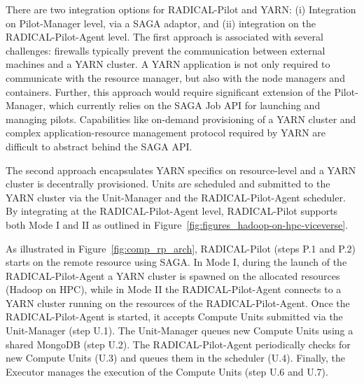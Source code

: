 There are two integration options for RADICAL-Pilot and YARN: (i) Integration on Pilot-Manager level, via a SAGA adaptor, and (ii) integration on the RADICAL-Pilot-Agent level.
The first approach is associated with several challenges: firewalls typically prevent the communication between external machines and a YARN cluster.
A YARN application is not only required to communicate with the resource manager, but also with the node managers and containers.
Further, this approach would require significant extension of the Pilot-Manager, which currently relies on the SAGA Job API for launching and managing pilots.
Capabilities like on-demand provisioning of a YARN cluster and complex application-resource management protocol required by YARN are difficult to abstract behind the SAGA API.

The second approach encapsulates YARN specifics on resource-level and a YARN cluster is decentrally provisioned.
Units are scheduled and submitted to the YARN cluster via the Unit-Manager and the RADICAL-Pilot-Agent scheduler.
By integrating at the RADICAL-Pilot-Agent level, RADICAL-Pilot supports both Mode I and II as outlined in Figure~\ref{fig:figures_hadoop-on-hpc-viceverse}.

As illustrated in Figure~\ref{fig:comp_rp_arch}, RADICAL-Pilot  (steps P.1 and P.2) starts on the remote resource using SAGA.
In Mode I, during the launch of the RADICAL-Pilot-Agent a YARN cluster is spawned on the allocated resources (Hadoop on HPC), while in Mode II the RADICAL-Pilot-Agent connects to a YARN cluster running on the resources of the RADICAL-Pilot-Agent.
Once the RADICAL-Pilot-Agent is started, it accepts Compute Units submitted via the Unit-Manager (step U.1).
The Unit-Manager queues new Compute Units using a shared MongoDB (step U.2).
The RADICAL-Pilot-Agent periodically checks for new Compute Units (U.3) and queues them in the scheduler (U.4).
Finally, the Executor manages the execution of the Compute Units (step U.6 and U.7).

